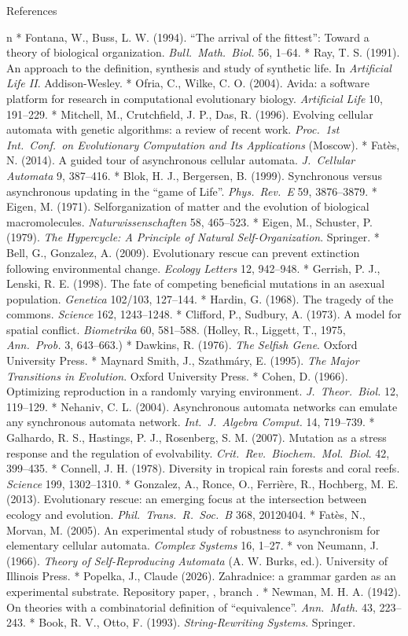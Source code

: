 \sec References

\begitems\style n
* Fontana, W., Buss, L. W. (1994). “The arrival of the fittest”:
Toward a theory of biological organization. {\it Bull.\ Math.\
Biol.} 56, 1--64.
* Ray, T. S. (1991). An approach to the definition, synthesis and
study of synthetic life. In {\it Artificial Life II}.
Addison-Wesley.
* Ofria, C., Wilke, C. O. (2004). Avida: a software platform for
research in computational evolutionary biology. {\it Artificial
Life} 10, 191--229.
* Mitchell, M., Crutchfield, J. P., Das, R. (1996). Evolving
cellular automata with genetic algorithms: a review of recent
work. {\it Proc.\ 1st Int.\ Conf.\ on Evolutionary Computation and
Its Applications} (Moscow).
* Fatès, N. (2014). A guided tour of asynchronous cellular
automata. {\it J.\ Cellular Automata} 9, 387--416.
* Blok, H. J., Bergersen, B. (1999). Synchronous versus
asynchronous updating in the “game of Life”. {\it Phys.\ Rev.\
E} 59, 3876--3879.
* Eigen, M. (1971). Selforganization of matter and the evolution
of biological macromolecules. {\it Naturwissenschaften} 58,
465--523.
* Eigen, M., Schuster, P. (1979). {\it The Hypercycle: A Principle
of Natural Self-Organization}. Springer.
* Bell, G., Gonzalez, A. (2009). Evolutionary rescue can prevent
extinction following environmental change. {\it Ecology Letters}
12, 942--948.
* Gerrish, P. J., Lenski, R. E. (1998). The fate of competing
beneficial mutations in an asexual population. {\it Genetica}
102/103, 127--144.
* Hardin, G. (1968). The tragedy of the commons. {\it Science}
162, 1243--1248.
* Clifford, P., Sudbury, A. (1973). A model for spatial conflict.
{\it Biometrika} 60, 581--588. (Holley, R., Liggett, T., 1975,
{\it Ann.\ Prob.} 3, 643--663.)
* Dawkins, R. (1976). {\it The Selfish Gene}. Oxford University
Press.
* Maynard Smith, J., Szathmáry, E. (1995). {\it The Major
Transitions in Evolution}. Oxford University Press.
* Cohen, D. (1966). Optimizing reproduction in a randomly varying
environment. {\it J.\ Theor.\ Biol.} 12, 119--129.
* Nehaniv, C. L. (2004). Asynchronous automata networks can
emulate any synchronous automata network. {\it Int.\ J.\ Algebra
Comput.} 14, 719--739.
* Galhardo, R. S., Hastings, P. J., Rosenberg, S. M. (2007).
Mutation as a stress response and the regulation of evolvability.
{\it Crit.\ Rev.\ Biochem.\ Mol.\ Biol.} 42, 399--435.
* Connell, J. H. (1978). Diversity in tropical rain forests and
coral reefs. {\it Science} 199, 1302--1310.
* Gonzalez, A., Ronce, O., Ferrière, R., Hochberg, M. E. (2013).
Evolutionary rescue: an emerging focus at the intersection between
ecology and evolution. {\it Phil.\ Trans.\ R.\ Soc.\ B} 368,
20120404.
* Fatès, N., Morvan, M. (2005). An experimental study of
robustness to asynchronism for elementary cellular automata.
{\it Complex Systems} 16, 1--27.
* von Neumann, J. (1966). {\it Theory of Self-Reproducing
Automata} (A. W. Burks, ed.). University of Illinois Press.
* Popelka, J., Claude (2026). Zahradnice: a grammar garden as an
experimental substrate. Repository paper,
\repo{paper/zahradnice-substrate.tex}, branch \repo{research}.
* Newman, M. H. A. (1942). On theories with a combinatorial
definition of “equivalence”. {\it Ann.\ Math.} 43, 223--243.
* Book, R. V., Otto, F. (1993). {\it String-Rewriting Systems}.
Springer.
\enditems

